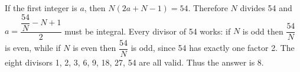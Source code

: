 If the first integer is $ a $, then $ N(2a+N-1)=54 $. Therefore $ N $ divides 54 and $ a=\dfrac{\dfrac{54}{N}-N+1}{2}$ must be integral. Every divisor of 54 works: if $ N $ is odd then $\dfrac{54}{N}$ is even, while if $ N $ is even then $\dfrac{54}{N}$ is odd, since 54 has exactly one factor 2. The eight divisors 1, 2, 3, 6, 9, 18, 27, 54 are all valid. Thus the answer is $\boxed{8}$.
